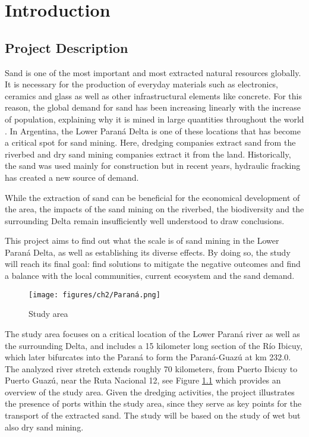 \chapter{Introduction}
\label{chapter:introduction}

\section{Project Description}

Sand is one of the most important and most extracted natural resources globally. It is necessary for the production of everyday materials such as electronics, ceramics and glass as well as other infrastructural elements like concrete. For this reason, the global demand for sand has been increasing linearly with the increase of population, explaining why it is mined in large quantities throughout the world \autocite{Wwf}. 
In Argentina, the Lower Paraná Delta is one of these locations that has become a critical spot for sand mining. Here, dredging companies extract  sand from the riverbed and dry sand mining companies extract it from the land. Historically, the sand was used mainly for construction but in recent years, hydraulic fracking has created a new source of demand.

While the extraction of sand can be beneficial for the economical development of the area, the impacts of the sand mining on the riverbed, the biodiversity and the surrounding Delta remain insufficiently well understood to draw conclusions. 

This project aims to find out what the scale is of sand mining in the Lower Paraná Delta, as well as establishing its diverse effects. By doing so, the study will reach its final goal: find solutions to mitigate the negative outcomes and find a balance with the local communities, current ecosystem and the sand demand. 

\begin{figure}[H]
    \centering    \texttt{[image: figures/ch2/Paraná.png]}
    \caption{Study area}
    \label{fig:study area}
\end{figure}
\label{Figure 1.1}

The study area focuses on a critical location of the Lower Paraná river as well as the surrounding Delta, and includes a 15 kilometer long section of the Río Ibicuy, which later bifurcates into the Paraná to form the Paraná-Guazú at km 232.0. The analyzed river stretch extends roughly 70 kilometers, from Puerto Ibicuy to Puerto Guazú, near the Ruta Nacional 12, see Figure \ref{fig:study area} which provides an overview of the study area. Given the dredging activities, the project illustrates the presence of ports within the study area, since they serve as key points for the transport of the extracted sand. The study will be based on the study of wet but also dry sand mining.

